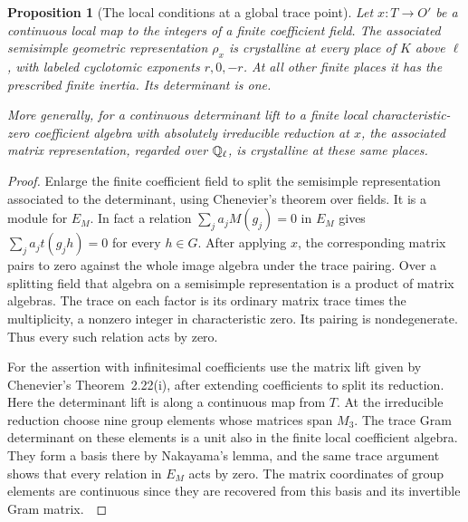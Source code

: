 \documentclass[a4paper,11pt]{article}
\newtheorem{proposition}{Proposition}[section]
\theoremstyle{definition}
\theoremstyle{remark}
\numberwithin{equation}{section}
\begin{document}
\begin{proposition}[The local conditions at a global trace point]
\label{prop:tracecrystal375}
Let \(x:T\to O'\) be a continuous local map to the integers
of a finite coefficient field. The associated semisimple
geometric representation \(\rho_x\) is crystalline at every
place of \(K\) above \(\ell\), with labeled cyclotomic exponents
\(r,0,-r\). At all other finite places it has the prescribed
finite inertia. Its determinant is one.

More generally, for a continuous determinant lift to a
finite local characteristic-zero coefficient algebra with
absolutely irreducible reduction at \(x\), the associated
matrix representation, regarded over \(\mathbb Q_\ell\), is
crystalline at these same places.
\end{proposition}
\begin{proof}
Enlarge the finite coefficient field to split the semisimple
representation associated to the determinant, using
Chenevier's theorem over fields. It is a module for \(E_M\).
In fact a relation \(\sum_j a_j M(g_j)=0\) in \(E_M\) gives
\(\sum_j a_j t(g_j h)=0\) for every \(h\in G\). After applying
\(x\), the corresponding matrix pairs to zero against the
whole image algebra under the trace pairing. Over a splitting
field that algebra on a semisimple representation is a product
of matrix algebras. The trace on each factor is its ordinary
matrix trace times the multiplicity, a nonzero integer in
characteristic zero. Its pairing is nondegenerate. Thus every
such relation acts by zero.

For the assertion with infinitesimal coefficients use the
matrix lift given by Chenevier's Theorem~2.22(i), after
extending coefficients to split its reduction. Here the
determinant lift is along a continuous map from \(T\).
At the irreducible reduction choose nine group elements
whose matrices span \(M_3\). The trace Gram determinant
on these elements is a unit also in the finite local
coefficient algebra. They form a basis there by Nakayama's
lemma, and the same trace argument shows that every relation
in \(E_M\) acts by zero. The matrix coordinates of group
elements are continuous since they are recovered from this
basis and its invertible Gram matrix.~\cite{VII-V-chenevier364}


\end{proof}
\end{document}
